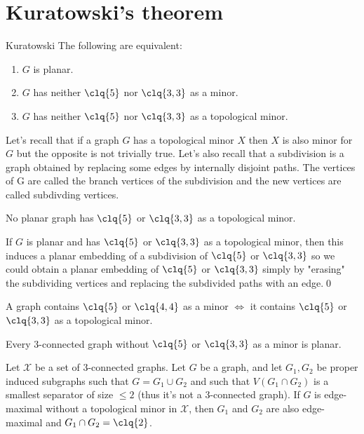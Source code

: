 \section*{Kuratowski's theorem}
\begin{customtheorem}{Kuratowski}
\label{theorem:kuratowski}
    The following are equivalent:
    \begin{enumerate}
        \item $G$ is planar.
        \item $G$ has neither $\clq{5}$ nor $\clq{3, 3}$ as a minor.
        \item $G$ has neither $\clq{5}$ nor $\clq{3, 3}$ as a topological minor.
    \end{enumerate}
\end{customtheorem}
Let's recall that if a graph $G$ has a topological minor $X$ then $X$ is also minor for $G$ but the opposite is not trivially true. Let's also recall that a subdivision is a graph obtained by replacing some edges by internally disjoint paths. The vertices of G are called the branch vertices of the subdivision and the new vertices are called subdivding vertices.
\begin{customlemma}{4.14}
\label{lemma:4.14}
    No planar graph has $\clq{5}$ or $\clq{3, 3}$ as a topological minor.
\end{customlemma}
\begin{prf}
    If $G$ is planar and has $\clq{5}$ or $\clq{3, 3}$ as a topological minor, then this induces a planar embedding of a subdivision of $\clq{5}$ or $\clq{3, 3}$ so we could obtain a planar embedding of $\clq{5}$ or $\clq{3, 3}$ simply by "erasing" the subdividing vertices and replacing the subdivided paths with an edge.\qed
\end{prf}
\begin{customlemma}{4.15}
\label{lemma:4.15}
    A graph contains $\clq{5}$ or $\clq{4, 4}$ as a minor $\iff$ it contains $\clq{5}$ or $\clq{3, 3}$ as a topological minor.
\end{customlemma}
\begin{customlemma}{4.16}
\label{lemma:4.16}
    Every $3$-connected graph without $\clq{5}$ or $\clq{3, 3}$ as a minor is planar.
\end{customlemma}
\begin{customlemma}{4.17}
\label{lemma:4.17}
    Let $\mathcal{X}$ be a set of $3$-connected graphs. Let $G$ be a graph, and let $G_1, G_2$ be proper induced subgraphs such that $G = G_1 \cup G_2$ and such that $V(G_1 \cap G_2)$ is a smallest separator of size $\leq 2$ (thus it's not a $3$-connected graph). If $G$ is edge-maximal without a topological minor in $\mathcal{X}$, then $G_1$ and $G_2$ are also edge-maximal and $G_1 \cap G_2 = \clq{2}$.
\end{customlemma}
